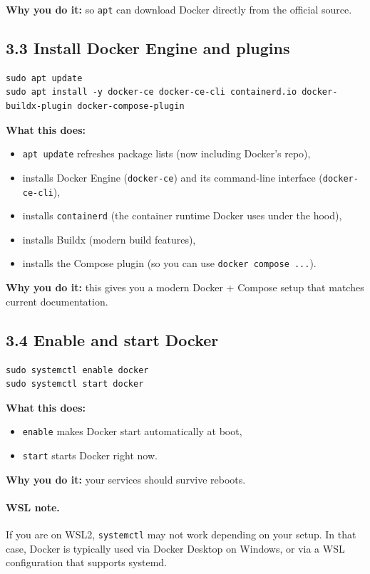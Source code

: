 \textbf{Why you do it:} so \texttt{apt} can download Docker directly from the official source.

\subsection{3.3 Install Docker Engine and plugins}
\begin{lstlisting}
sudo apt update
sudo apt install -y docker-ce docker-ce-cli containerd.io docker-buildx-plugin docker-compose-plugin
\end{lstlisting}

\textbf{What this does:}
\begin{itemize}[leftmargin=*]
  \item \texttt{apt update} refreshes package lists (now including Docker's repo),
  \item installs Docker Engine (\texttt{docker-ce}) and its command-line interface (\texttt{docker-ce-cli}),
  \item installs \texttt{containerd} (the container runtime Docker uses under the hood),
  \item installs Buildx (modern build features),
  \item installs the Compose plugin (so you can use \texttt{docker compose ...}).
\end{itemize}

\textbf{Why you do it:} this gives you a modern Docker + Compose setup that matches current documentation.

\subsection{3.4 Enable and start Docker}
\begin{lstlisting}
sudo systemctl enable docker
sudo systemctl start docker
\end{lstlisting}

\textbf{What this does:}
\begin{itemize}[leftmargin=*]
  \item \texttt{enable} makes Docker start automatically at boot,
  \item \texttt{start} starts Docker right now.
\end{itemize}

\textbf{Why you do it:} your services should survive reboots.

\paragraph{WSL note.}
If you are on WSL2, \texttt{systemctl} may not work depending on your setup.
In that case, Docker is typically used via Docker Desktop on Windows, or via a WSL configuration that supports systemd.

